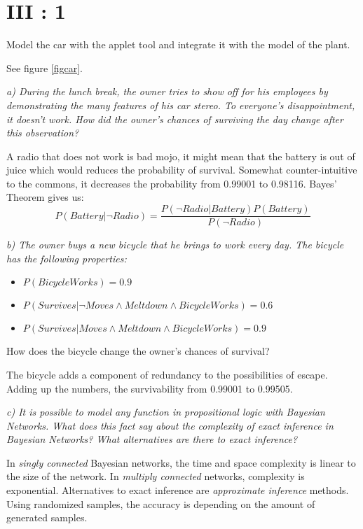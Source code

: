 \section{III : 1}
\begin{framed}Model the car with the applet tool and integrate it with the model of the plant.\end{framed}

See figure \ref{figcar}.


\begin{framed}\em a) During the lunch break, the owner tries to show off for his employees by demonstrating the many features of his car stereo. To everyone's disappointment, it doesn't work. How did the owner's chances of surviving the day change after this observation?\em\end{framed}

A radio that does not work is bad mojo, it might mean that the battery is out of juice which would reduces the probability of survival. Somewhat counter-intuitive to the commons, it decreases the probability from 0.99001 to 0.98116. Bayes' Theorem gives us: $$P(Battery|\neg Radio) = \frac{P(\neg Radio|Battery)P(Battery)}{P(\neg Radio)}$$

\begin{framed}\em b) The owner buys a new bicycle that he brings to work every day. The bicycle has the following properties:
\begin{itemize}
  \item $P(BicycleWorks) = 0.9$
  \item $P(Survives | \neg Moves \land Meltdown \land BicycleWorks) = 0.6$
  \item $P(Survives | Moves \land Meltdown \land BicycleWorks) = 0.9$
\end{itemize}
How does the bicycle change the owner's chances of survival? \em\end{framed}

The bicycle adds a component of redundancy to the possibilities of escape. Adding up the numbers, the survivability from 0.99001 to 0.99505.

\begin{framed}\em c) It is possible to model any function in propositional logic with Bayesian Networks. What does this fact say about the complexity of exact inference in Bayesian Networks? What alternatives are there to exact inference? \em\end{framed}

In \emph{singly connected} Bayesian networks, the time and space complexity is linear to the size of the network. In \emph{multiply connected} networks, complexity is exponential. Alternatives to exact inference are \emph{approximate inference} methods. Using randomized samples, the accuracy is depending on the amount of generated samples.
\newpage

